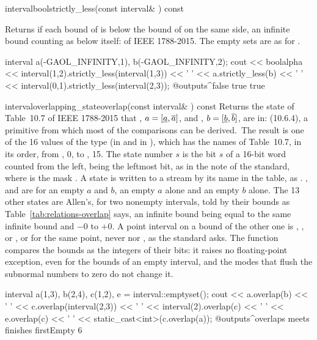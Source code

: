 \begin{defmethod}{interval}{bool}{strictly\_less}{(const interval\& ) const}
  \begin{operation}
  \end{operation}
  Returns  if each bound of  is below the bound of
   on the same side, an infinite bound counting as below itself:
   of IEEE 1788-2015. The empty sets are as for
  .\newinvfive
\begin{example}
interval a(-GAOL_INFINITY,1), b(-GAOL_INFINITY,2);
cout << boolalpha << interval(1,2).strictly_less(interval(1,3)) << ' '
     << a.strictly_less(b) << ' '
     << interval(0,1).strictly_less(interval(2,3));
@outputs^false true true~
\end{example}
\end{defmethod}

\begin{defmethod}{interval}{overlapping\_state}{overlap}{(const interval\& ) const}
  Returns the state of Table~10.7 of IEEE 1788-2015 that , $a =
  [\underline{a}, \overline{a}]$, and , $b = [\underline{b},
  \overline{b}]$, are in:  (10.6.4), a primitive from which
  most of the comparisons can be derived.\newinvfive\ The result is one of the 16
  values of the type  (in  and in
  ), which has the names of Table~10.7, in its order,
  from , 0, to , 15. The state number $s$ is the
  bit $s$ of a 16-bit word counted from the left,  being the
  leftmost bit, as in the note of the standard, where  is the
  mask . A state is written to a stream by its name in the
  table, as . ,  and
   are for an empty $a$ and $b$, an empty $a$ alone and an
  empty $b$ alone. The 13 other states are Allen's, for two nonempty
  intervals, told by their bounds as Table~\ref{tab:relations-overlap} says,
  an infinite bound being equal to the same infinite bound and $-0$ to $+0$.
  A point interval on a bound of the other one is ,
  ,  or , or
   for the same point, never  nor
  , as the standard
  asks. The function compares the bounds as the integers of their bits: it
  raises no floating-point exception, even for the  bounds of an
  empty interval, and the modes that flush the subnormal numbers to zero do
  not change it.
  \begin{example}
interval a(1,3), b(2,4), c(1,2), e = interval::emptyset();
cout << a.overlap(b) << ' ' << c.overlap(interval(2,3)) << ' '
     << interval(2).overlap(c) << ' ' << e.overlap(c) << ' '
     << static_cast<int>(c.overlap(a));
@outputs^overlaps meets finishes firstEmpty 6~
  \end{example}
\end{defmethod}

